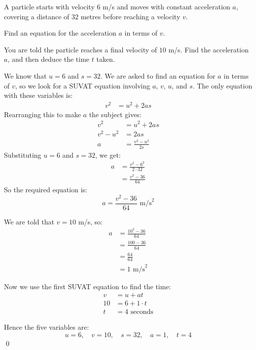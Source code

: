 \begin{example}
A particle starts with velocity $6$ m/s and moves with constant acceleration $a$, covering a distance of $32$ metres before reaching a velocity $v$.

Find an equation for the acceleration $a$ in terms of $v$.

You are told the particle reaches a final velocity of $10$ m/s. Find the acceleration $a$, and then deduce the time $t$ taken.

\end{example}
\begin{solution}
We know that $u = 6$ and $s = 32$. We are asked to find an equation for $a$ in terms of $v$, so we look for a SUVAT equation involving $a$, $v$, $u$, and $s$. The only equation with these variables is:
\begin{align*}
    v^2 &= u^2 + 2as
\end{align*}
Rearranging this to make $a$ the subject gives:
\begin{align*}
    v^2 &= u^2 + 2as \\
    v^2 - u^2 &= 2as \\
    a &= \frac{v^2 - u^2}{2s}
\end{align*}
Substituting $u = 6$ and $s = 32$, we get:
\begin{align*}
    a &= \frac{v^2 - 6^2}{2 \cdot 32} \\
    &= \frac{v^2 - 36}{64}
\end{align*}
So the required equation is:
\[
a = \frac{v^2 - 36}{64} \text{ m/s}^2
\]

We are told that $v = 10$ m/s, so:
\begin{align*}
    a &= \frac{10^2 - 36}{64} \\
    &= \frac{100 - 36}{64} \\
    &= \frac{64}{64} \\
    &= 1 \text{ m/s}^2
\end{align*}

Now we use the first SUVAT equation to find the time:
\begin{align*}
    v &= u + at \\
    10 &= 6 + 1 \cdot t \\
    t &= 4 \text{ seconds}
\end{align*}

Hence the five variables are:
\[
u = 6,\quad v = 10,\quad s = 32,\quad a = 1,\quad t = 4
\]
\qed
\end{solution}

